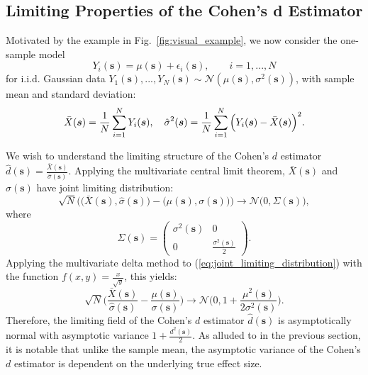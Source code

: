 \subsection{Limiting Properties of the Cohen's d Estimator}
\label{sec:gauss_sig_plus_noise}
Motivated by the example in Fig.\ \ref{fig:visual_example}, we now consider the one-sample model
\begin{equation}
\label{eq:sig_plus_noise}
Y_{i}(\bm{s}) = \mu(\bm{s}) + \epsilon_{i}(\bm{s}), \qquad i = 1, ..., N
\end{equation}
for i.i.d. Gaussian data $Y_{1}(\bm{s}), ..., Y_{N}(\bm{s}) \sim \mathcal{N}(\mu(\bm{s}),\sigma^{2}(\bm{s}))$, with sample mean and standard deviation:
\begin{equation}
\label{eq:unbiased_estimators}
\bar{X}(\bm{s}) = \frac{1}{N}\sum_{i=1}^{N} Y_{i}(\bm{s}), \hspace{10pt} \operatorname{\hat{\sigma}}^{2}(\bm{s}) = \frac{1}{N}\sum_{i=1}^{N} \Big(Y_{i}(\bm{s}) - \bar{X}(\bm{s})\Big)^{2}.    
\end{equation}

We wish to understand the limiting structure of the Cohen's $d$ estimator $\hat{d}(\bm{s}) = \frac{\bar{X}(\bm{s})}{\hat{\sigma}(\bm{s})}$. Applying the multivariate central limit theorem, $\bar{X}(\bm{s})$ and $\hat{\sigma}(\bm{s})$ have joint limiting distribution: 
\begin{equation}
\label{eq:joint_limiting_distribution}
\sqrt{N}\Big(\Big(\bar{X}(\bm{s}), \hat{\sigma}(\bm{s})\Big) - \Big(\mu(\bm{s}),\sigma(\bm{s})\Big)\Big) \rightarrow \mathcal{N}\Big(0, \Sigma(\bm{s}) \Big),
\end{equation}
where
\begin{equation}
\label{eq:covariance_matrix}
\Sigma(\bm{s}) = \begin{pmatrix}
			\sigma^{2}(\bm{s}) & 0 \\
            0 & \frac{\sigma^{2}(\bm{s})}{2} 
         \end{pmatrix}.
\end{equation}
Applying the multivariate delta method to (\ref{eq:joint_limiting_distribution}) with the function $f(x,y) = \frac{x}{\sqrt{y}}$, this yields:
\begin{equation}
\label{eq:cohen_limiting_distribution}
\sqrt{N}\Bigg( \frac{\bar{X}(\bm{s})}{\hat{\sigma}(\bm{s})} - \frac{\mu(\bm{s})}{\sigma(\bm{s})} \Bigg) \rightarrow \mathcal{N}\Bigg(0, 1 + \frac{\mu^{2}(\bm{s})}{2\sigma^{2}(\bm{s})} \Bigg).
\end{equation}
Therefore, the limiting field of the Cohen's $d$ estimator $\hat{d}(\bm{s})$ is asymptotically normal with asymptotic variance $1 + \frac{d^{2}(\bm{s})}{2}$. As alluded to in the previous section, it is notable that unlike the sample mean, the asymptotic variance of the Cohen's $d$ estimator is dependent on the underlying true effect size.

